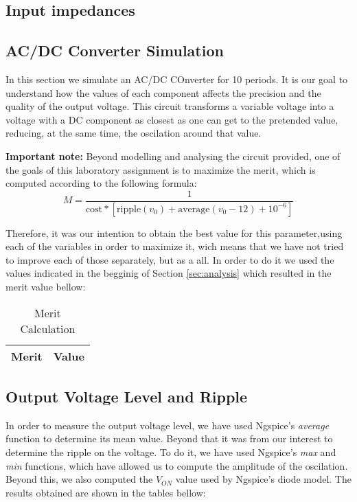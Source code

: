 \newpage
\subsection{Input impedances}









\subsection{AC/DC Converter Simulation}
\label{subsec:circuit_simulation}
\par In this section we simulate an AC/DC COnverter for 10 periods. It is our goal to understand how the values of each component affects the precision and the quality of the output voltage. This circuit transforms a variable voltage into a voltage with a DC component as closest as one can get to the pretended value, reducing, at the same time, the oscilation around that value.

\par  \textbf{Important note:} Beyond modelling and analysing the circuit provided, one of the goals of this laboratory assignment is to maximize the merit, which is computed according to the following formula:
\begin{equation}
M = \frac{1}{\text{cost}*[\text{ripple}(v_0)+\text{average}(v_{0}-12)+10^{-6}]}
\end{equation}

Therefore, it was our intention to obtain the best value for this parameter,using each of the variables in order to maximize it, wich means that we have not tried to improve each of those separately, but as a all.
In order to do it we used the values indicated in the begginig of Section \ref{sec:analysis} which resulted in the merit value bellow:

\begin{table}[H]
  \centering
  \begin{tabular}{ | m{11cm} | m{3cm}| } 
    \hline    
    {\bf Merit} & {\bf Value} \\ \hline
    
  \end{tabular}
  \caption{Merit Calculation}
  \label{tab:merit}
\end{table}




\subsection{Output Voltage Level and Ripple}
\label{subsec:out_voltage}
In order to measure the output voltage level, we have used Ngspice's \textit{average} function to determine its mean value. Beyond that it was from our interest to determine the ripple on the voltage. To do it, we have used Ngspice's \textit{max} and \textit{min} functions, which have allowed us to compute the amplitude of the oscilation. Beyond this, we also computed the $V_{ON}$ value used by Ngspice's diode model. The results obtained are shown in the tables bellow:


